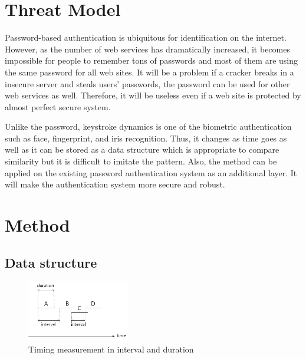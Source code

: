 \documentclass[twocolumn,showpacs,%
  nofootinbib,aps,%
  eqsecnum,prd,notitlepage,showkeys,10pt]{revtex4-1}
\begin{document}
\section{Threat Model}
Password-based authentication is ubiquitous for identification on the internet. However, as the number of web services has dramatically increased, it becomes impossible for people to remember tons of passwords and most of them are using the same password for all web sites. It will be a problem if a cracker breaks in a insecure server and steals users' passwords, the password can be used for other web services as well. Therefore, it will be useless even if a web site is protected by almost perfect secure system.\par
Unlike the password, keystroke dynamics is one of the biometric authentication such as face, fingerprint, and iris recognition\cite{karnan2011biometric}. Thus, it changes as time goes as well as it can be stored as a data structure which is appropriate to compare similarity but it is difficult to imitate the pattern. Also, the method can be applied on the existing password authentication system as an additional layer. It will make the authentication system more secure and robust.

\section{Method}
\subsection{Data structure}
\begin{figure}[h]
  \centering
  \includegraphics[width=0.4\textwidth]{keystroke}
  \caption{Timing measurement in interval and duration}
  \label{fig:keystroke}
\end{figure}
\end{document}
